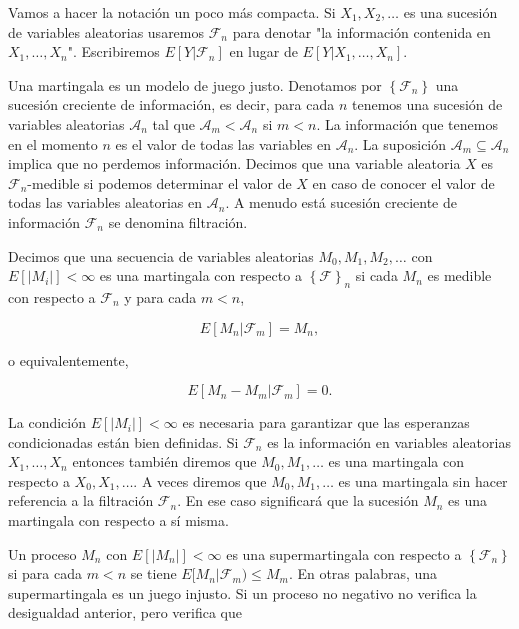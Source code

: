 Vamos a hacer la notación un poco más compacta. Si $X_1, X_2, \ldots$ es una sucesión de variables aleatorias usaremos $\mathcal{F}_n$ para denotar "la información contenida en $X_1, \ldots, X_n$". Escribiremos $E[Y | \mathcal{F}_n]$ en lugar de $E[Y | X_1, \ldots, X_n]$.

Una martingala es un modelo de juego justo. Denotamos por $\left \{ \mathcal{F}_n \right \}$ una sucesión creciente de información, es decir, para cada $n$ tenemos una sucesión de variables aleatorias $\mathcal{A}_n$ tal que $\mathcal{A}_m < \mathcal{A}_n$ si $m<n$. La información que tenemos en el momento $n$ es el valor de todas las variables en $\mathcal{A}_n$. La suposición $\mathcal{A}_m \subseteq \mathcal{A}_n$ implica que no perdemos información. Decimos que una variable aleatoria $X$ es $\mathcal{F}_n$-medible si podemos determinar el valor de $X$ en caso de conocer el valor de todas las variables aleatorias en $\mathcal{A}_n$. A menudo está sucesión creciente de información $\mathcal{F}_n$ se denomina filtración.

Decimos que una secuencia de variables aleatorias $M_0, M_1, M_2, \ldots$ con $E[ |M_i|] < \infty$ es una martingala con respecto a $\left \{ \mathcal{F} \right \} _n$ si cada $M_n$ es medible con respecto a $\mathcal{F}_n$ y para cada $m<n$,

\begin{equation}\label{eq:martingala}
	E[M_n | \mathcal{F}_m] = M_n,
\end{equation}

o equivalentemente,

\begin{equation}
	E[M_n - M_m |\mathcal{F}_m] = 0.
\end{equation}	

La condición $E[|M_i|] < \infty$ es necesaria para garantizar que las esperanzas condicionadas están bien definidas. Si $\mathcal{F}_n$ es la información en variables aleatorias $X_1, \ldots, X_n$ entonces también diremos que $M_0, M_1, \ldots$ es una martingala con respecto a $X_0, X_1, \ldots$. A veces diremos que $M_0, M_1, \ldots$ es una martingala sin hacer referencia a la filtración $\mathcal{F}_n$. En ese caso significará que la sucesión $M_n$ es una martingala con respecto a sí misma. 

Un proceso $M_n$ con $E[|M_n|] < \infty$ es una supermartingala con respecto a $\left \{ \mathcal{F}_n \right \}$ si para cada $m<n$ se tiene $E[M_n | \mathcal{F}_m) \leq M_m$. En otras palabras, una supermartingala es un juego injusto. Si un proceso no negativo no verifica la desigualdad anterior, pero verifica que 

